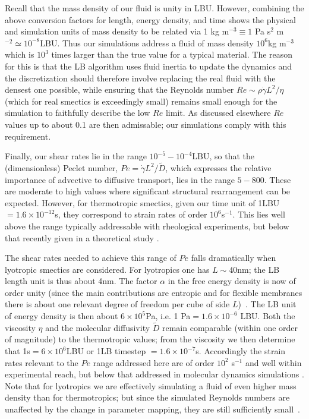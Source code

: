 \documentclass[8.5pt,twoside,twocolumn]{article}
\begin{document}
Recall that the mass density of our fluid is unity in LBU. However, combining the above conversion factors for length,  energy density, and time shows the physical and simulation units of mass density to be related via 1 kg m$^{-3} \equiv 1$ Pa s$^2$ m$^{-2} \simeq 10^{-8}$LBU. Thus our simulations address a fluid of mass density $10^6$kg m$^{-3}$ which is $10^3$ times larger than the true value for a typical material. The reason for this is that the LB algorithm uses fluid inertia to update the dynamics and the discretization should therefore involve replacing the real fluid with the densest one possible, while ensuring that the Reynolds number $Re \sim \rho\dot\gamma L^2/\eta$ (which for real smectics is exceedingly small) remains small enough for the simulation to faithfully describe the low $Re$ limit. As discussed elsewhere \cite{Cates04, Cates09} $Re$ values up to about 0.1 are then admissable; our simulations comply with this requirement. 

Finally, our shear rates lie in the range 
$10^{-5}-10^{-4}$LBU, so that the (dimensionless) Peclet number, $Pe =\dot\gamma L^2/\tilde D$, which expresses the relative importance of advective to diffusive transport, lies in the range $5-800$. These are moderate to high values where significant structural rearrangement can be expected. However, for thermotropic smectics, given our time unit of 1LBU$=1.6\times 10^{-12}$s, they correspond to strain rates of order $10^6$s$^{-1}$. This lies well above the range typically addressable with rheological experiments, but below that recently given in a theoretical study \cite{Stewart2009}.

The shear rates needed to achieve this range of $Pe$ falls dramatically when lyotropic smectics are considered. For lyotropics one has $L\sim 40$nm; the LB length unit is thus about 4nm. The factor $\alpha$ in the free energy density is now of order unity (since the main contributions are entropic and for flexible membranes there is about one relevant degree of freedom per cube of side $L$)~\cite{Safran}. The LB unit of energy density is then about $6\times 10^{5}$Pa, i.e. 1 Pa$= 1.6 \times 10^{-6}$ LBU. Both the viscosity $\eta$ and the molecular diffusivity $\tilde D$ remain comparable (within one order of magnitude) to the thermotropic values; from the viscosity we then determine that 1s$=6\times 10^6$LBU or 1LB timestep $=1.6\times 10^{-7}$s. Accordingly the strain rates relevant to the $Pe$ range addressed here are of order $10^2$ s$^{-1}$ and well within experimental reach, but below that addressed in molecular dynamics simulations \cite{Guo2002,Soddemann2004}. Note that for lyotropics we are effectively simulating a fluid of even higher mass density than for thermotropics; but since the simulated Reynolds numbers are unaffected by the change in parameter mapping, they are still sufficiently small~\cite{Cates04}. 
\end{document}
